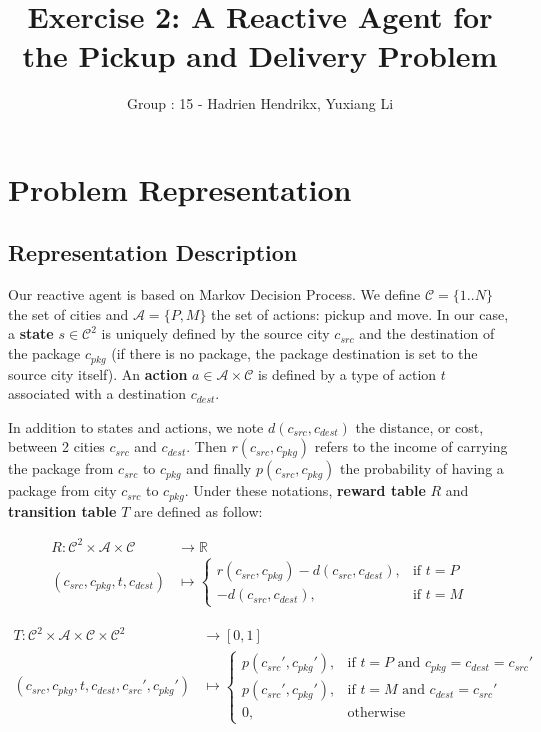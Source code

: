 \documentclass[11pt]{article}
\title{\bf Exercise 2: A Reactive Agent for the Pickup and Delivery Problem}
\author{Group \textnumero: 15 - Hadrien Hendrikx, Yuxiang Li}
\begin{document}
\maketitle

\section{Problem Representation}

\subsection{Representation Description}

Our reactive agent is based on Markov Decision Process. We define $\mathcal{C} = \{1 .. N\}$ the set of cities and $\mathcal{A} = \{P, M\}$ the set of actions: pickup and move. In our case, a \textbf{state} $s \in \mathcal{C}^2$ is uniquely defined by the source city $c_{src}$ and the destination of the package $c_{pkg}$ (if there is no package, the package destination is set to the source city itself). An \textbf{action} $a \in \mathcal{A} \times \mathcal{C}$ is defined by a type of action $t$ associated with a destination $c_{dest}$. 

In addition to states and actions, we note $d(c_{src},c_{dest})$ the distance, or cost, between 2 cities $c_{src}$ and $c_{dest}$. Then $r(c_{src},c_{pkg})$ refers to the income of carrying the package from $c_{src}$ to $c_{pkg}$ and finally $p(c_{src},c_{pkg})$ the probability of having a package from city $c_{src}$ to $c_{pkg}$. Under these notations, \textbf{reward table} $R$ and \textbf{transition table} $T$ are defined as follow:

\begin{align*}
  R \colon \mathcal{C}^2 \times \mathcal{A} \times \mathcal{C} &\to \mathbb{R} \\
  (c_{src}, c_{pkg}, t, c_{dest}) &\mapsto 
  \begin{cases} 
	  r(c_{src},c_{pkg}) - d(c_{src},c_{dest}), & \mbox{if } t = P \\ 
	  - d(c_{src},c_{dest}), & \mbox{if } t = M 
  \end{cases} 
\end{align*}

\begin{align*}
  T \colon \mathcal{C}^2 \times \mathcal{A} \times \mathcal{C} \times \mathcal{C}^2 &\to [0, 1] \\
  (c_{src}, c_{pkg}, t, c_{dest}, c_{src}', c_{pkg}') &\mapsto 
  \begin{cases} 
	  p(c_{src}',c_{pkg}'), & \mbox{if } t = P \mbox{ and } c_{pkg} = c_{dest} = c_{src}' \\ 
	  p(c_{src}',c_{pkg}'), & \mbox{if } t = M \mbox{ and } c_{dest} = c_{src}' \\ 
	  0, & \mbox{otherwise} 
  \end{cases} 
\end{align*}
\end{document}
